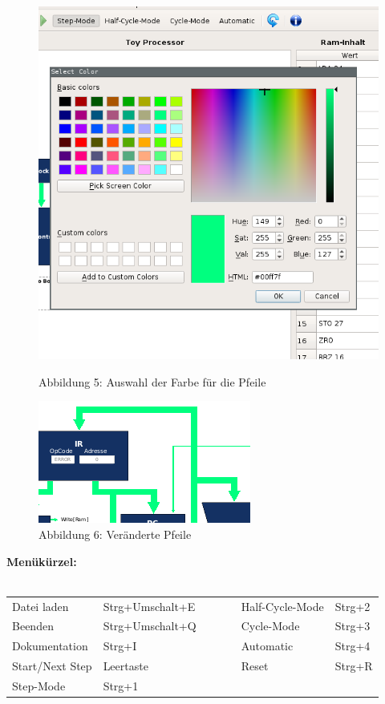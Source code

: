 \documentclass{article}
\begin{document}
\vspace{1cm}

\begin{figure}[h!]
    \centering
    \begin{minipage}{0.49\textwidth}
        \centering
        \includegraphics[height=0.6\linewidth]{./picture_farbauswahl.png}
        \caption* {Abbildung 5: Auswahl der Farbe für die Pfeile}
    \end{minipage}
    \begin{minipage}{0.49\textwidth}
        \centering
        \includegraphics[height=0.6\linewidth]{./picture_pfeile.png}
        \caption*{Abbildung 6: Veränderte Pfeile}
    \end{minipage}
\end{figure}

\vspace{1cm}

\noindent \textbf{Menükürzel:}\\\\
\noindent \begin{tabular}{lllllll}
    Datei laden & Strg+Umschalt+E & & & & Half-Cycle-Mode & Strg+2\\
    Beenden & Strg+Umschalt+Q & & & & Cycle-Mode & Strg+3\\
    Dokumentation & Strg+I & & & & Automatic & Strg+4\\
    Start/Next Step & Leertaste & & & & Reset & Strg+R\\
    Step-Mode & Strg+1 & & & & &
\end{tabular}
\end{document}
